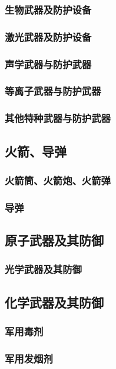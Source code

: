\documentclass[UTF8]{../ApplicationUniverse}
\begin{document}
        \subsubsection{生物武器及防护设备}
        \subsubsection{激光武器及防护设备}
        \subsubsection{声学武器与防护武器}
        \subsubsection{等离子武器与防护武器}
        \subsubsection{其他特种武器与防护武器}

    \subsection{火箭、导弹}
        \subsubsection{火箭筒、火箭炮、火箭弹}
        \subsubsection{导弹}
    \subsection{原子武器及其防御}
        \subsubsection{光学武器及其防御}
    \subsection{化学武器及其防御}
        \subsubsection{军用毒剂}
        \subsubsection{军用发烟剂}
\end{document}
